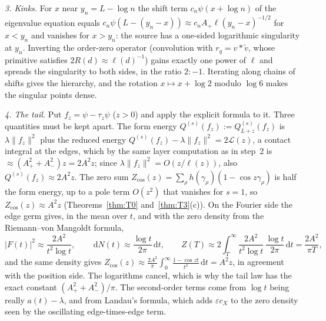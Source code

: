 \documentclass[11pt]{amsart}
\newcommand{\cL}{\mathcal{L}}
\newcommand{\dd}{\,\mathrm{d}}
\newcommand{\eps}{\varepsilon}
\theoremstyle{definition}
\theoremstyle{remark}
\numberwithin{equation}{section}
\begin{document}
\emph{3. Kinks.} For $x$ near $y_n=L-\log n$ the shift term $c_n\psi(x+\log n)$ of the eigenvalue equation equals $c_n\psi(L-(y_n-x))\approx c_nA_+\ell(y_n-x)^{-1/2}$ for $x<y_n$ and vanishes for $x>y_n$: the source has a one-sided logarithmic singularity at $y_n$. Inverting the order-zero operator (convolution with $r_q=v*\tilde v$, whose primitive satisfies $2R(d)\approx\ell(d)^{-1}$) gains exactly one power of $\ell$ and spreads the singularity to both sides, in the ratio $2:-1$. Iterating along chains of shifts gives the hierarchy, and the rotation $x\mapsto x+\log2$ modulo $\log6$ makes the singular points dense.

\emph{4. The tail.} Put $f_z=\psi-\tau_z\psi$ ($z>0$) and apply the explicit formula to it. Three quantities must be kept apart. The form energy $Q^{(s)}(f_z):=Q^{(s)}_{L+z}(f_z)$ is $\lambda\|f_z\|^2$ plus the reduced energy $Q^{(s)}(f_z)-\lambda\|f_z\|^2=2\cL(z)$, a contact integral at the edges, which by the same layer computation as in step~2 is $\approx(A_+^2+A_-^2)z=2A^2z$; since $\lambda\|f_z\|^2=O(z/\ell(z))$, also $Q^{(s)}(f_z)\approx2A^2z$. The zero sum $Z_{\cos}(z)=\sum_\rho h(\gamma_\rho)(1-\cos z\gamma_\rho)$ is half the form energy, up to a pole term $O(z^2)$ that vanishes for $s=1$, so $Z_{\cos}(z)\approx A^2z$ (Theorems~\ref{thm:T0} and~\ref{thm:T3}(c)). On the Fourier side the edge germ gives, in the mean over $t$, and with the zero density from the Riemann--von Mangoldt formula,
\[
|F(t)|^2\approx\frac{2A^2}{t^2\log t},\qquad\dd N(t)\approx\frac{\log t}{2\pi}\dd t,\qquad Z(T)\approx2\int_T^\infty\frac{2A^2}{t^2\log t}\,\frac{\log t}{2\pi}\dd t=\frac{2A^2}{\pi T},
\]
and the same density gives $Z_{\cos}(z)\approx\frac{2A^2}\pi\int_0^\infty\frac{1-\cos zt}{t^2}\dd t=A^2z$, in agreement with the position side. The logarithms cancel, which is why the tail law has the exact constant $(A_+^2+A_-^2)/\pi$. The second-order terms come from $\log t$ being really $a(t)-\lambda$, and from Landau's formula, which adds $\eps c_X$ to the zero density seen by the oscillating edge-times-edge term.
\end{document}
